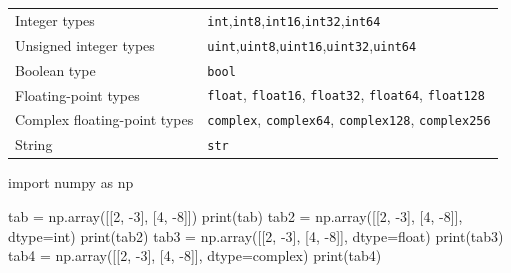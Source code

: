 \documentclass[
  english,
  letterpaper,
  DIV=11,
  numbers=noendperiod]{scrreprt}
\newenvironment{Shaded}{\begin{snugshade}}{\end{snugshade}}
\newcommand{\BuiltInTok}[1]{\textcolor[rgb]{0.00,0.23,0.31}{#1}}
\newcommand{\DecValTok}[1]{\textcolor[rgb]{0.68,0.00,0.00}{#1}}
\newcommand{\ImportTok}[1]{\textcolor[rgb]{0.00,0.46,0.62}{#1}}
\newcommand{\NormalTok}[1]{\textcolor[rgb]{0.00,0.23,0.31}{#1}}
\newcommand{\OperatorTok}[1]{\textcolor[rgb]{0.37,0.37,0.37}{#1}}
\newcounter{none} %
\begin{document}
{\def\LTcaptype{none} %
\begin{longtable}[]{@{}
  >{\raggedright\arraybackslash}p{}
  >{\raggedright\arraybackslash}p{}@{}}
\toprule\noalign{}
\endhead
\bottomrule\noalign{}
\endlastfoot
Integer types &
\texttt{int},\texttt{int8},\texttt{int16},\texttt{int32},\texttt{int64} \\
Unsigned integer types &
\texttt{uint},\texttt{uint8},\texttt{uint16},\texttt{uint32},\texttt{uint64} \\
Boolean type & \texttt{bool} \\
Floating-point types & \texttt{float}, \texttt{float16},
\texttt{float32}, \texttt{float64}, \texttt{float128} \\
Complex floating-point types & \texttt{complex}, \texttt{complex64},
\texttt{complex128}, \texttt{complex256} \\
String & \texttt{str} \\
\end{longtable}
}

\begin{Shaded}
\begin{Highlighting}[]
\ImportTok{import}\NormalTok{ numpy }\ImportTok{as}\NormalTok{ np}

\NormalTok{tab }\OperatorTok{=}\NormalTok{ np.array([[}\DecValTok{2}\NormalTok{, }\OperatorTok{{-}}\DecValTok{3}\NormalTok{], [}\DecValTok{4}\NormalTok{, }\OperatorTok{{-}}\DecValTok{8}\NormalTok{]])}
\BuiltInTok{print}\NormalTok{(tab)}
\NormalTok{tab2 }\OperatorTok{=}\NormalTok{ np.array([[}\DecValTok{2}\NormalTok{, }\OperatorTok{{-}}\DecValTok{3}\NormalTok{], [}\DecValTok{4}\NormalTok{, }\OperatorTok{{-}}\DecValTok{8}\NormalTok{]], dtype}\OperatorTok{=}\BuiltInTok{int}\NormalTok{)}
\BuiltInTok{print}\NormalTok{(tab2)}
\NormalTok{tab3 }\OperatorTok{=}\NormalTok{ np.array([[}\DecValTok{2}\NormalTok{, }\OperatorTok{{-}}\DecValTok{3}\NormalTok{], [}\DecValTok{4}\NormalTok{, }\OperatorTok{{-}}\DecValTok{8}\NormalTok{]], dtype}\OperatorTok{=}\BuiltInTok{float}\NormalTok{)}
\BuiltInTok{print}\NormalTok{(tab3)}
\NormalTok{tab4 }\OperatorTok{=}\NormalTok{ np.array([[}\DecValTok{2}\NormalTok{, }\OperatorTok{{-}}\DecValTok{3}\NormalTok{], [}\DecValTok{4}\NormalTok{, }\OperatorTok{{-}}\DecValTok{8}\NormalTok{]], dtype}\OperatorTok{=}\BuiltInTok{complex}\NormalTok{)}
\BuiltInTok{print}\NormalTok{(tab4)}
\end{Highlighting}
\end{Shaded}
\end{document}
